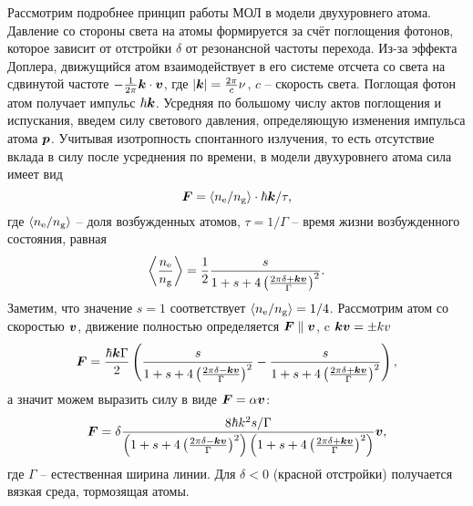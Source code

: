 % 


\startp
{}
Рассмотрим подробнее принцип работы МОЛ в модели двухуровнего атома. Давление со стороны света на атомы формируется за счёт поглощения фотонов, которое зависит от отстройки $\delta$ от резонансной частоты перехода. Из-за эффекта Доплера, движущийся атом взаимодействует в его системе отсчета со света на сдвинутой частоте $- \frac{1}{2\pi} \boldsymbol{k} \cdot \boldsymbol{v}$, где $|\boldsymbol{k}| = \frac{2\pi}{c}\nu$, $c$ -- скорость света. Поглощая фотон атом получает импульс $\hbar \boldsymbol{k}$. Усредняя по большому числу актов поглощения и испускания, введем силу светового давления, определяющую изменения импульса атома $\boldsymbol{p}$. Учитывая изотропность спонтанного излучения, то есть отсутствие вклада в силу после усреднения по времени, в модели двухуровнего атома сила имеет вид
\begin{equation}
	\boldsymbol{F} = \langle n_{\textnormal{e}} / n_{\textnormal{g}} \rangle \cdot \hbar \boldsymbol{k} / \tau,
\end{equation}
где $\langle n_{\textnormal{e}} / n_{\textnormal{g}} \rangle$ -- доля возбужденных атомов, $\tau = 1/\Gamma$ -- время жизни возбужденного состояния, равная
\begin{equation}
	\left\langle 
		\frac{n_{\textnormal{e}}}{n_{\textnormal{g}}}
	\right\rangle = \frac{1}{2} \frac{s}{1+s+4\left(\frac{2 \pi \delta + \boldsymbol{k} \boldsymbol{v}}{\Gamma}\right)^2}.
\end{equation}
Заметим, что значение $s=1$ соответствует $\langle n_{\textnormal{e}} / n_{\textnormal{g}} \rangle=1/4$. Рассмотрим атом со скоростью $\boldsymbol{v}$, движение полностью определяется $\boldsymbol{F} \parallel \boldsymbol{v}$, c $\boldsymbol{k} \boldsymbol{v} = \pm k v$
\begin{equation}
	\boldsymbol{F} = \frac{\hbar \boldsymbol{k} \Gamma}{2}\left(
		\frac{s}{1+s+4\left(\frac{2\pi \delta - \boldsymbol{k} \boldsymbol{v}}{\Gamma}\right)^2}-
		\frac{s}{1+s+4\left(\frac{2\pi \delta + \boldsymbol{k} \boldsymbol{v}}{\Gamma}\right)^2}
	\right),
	\label{eq:FM1}
\end{equation}
а значит можем выразить силу в виде $\boldsymbol{F} = \alpha \boldsymbol{v}$:
\begin{equation}
	\boldsymbol{F} = \delta \frac{8 \hbar k^2  s / \Gamma}{
		\left(
			1+s+4\left(\frac{2\pi \delta - \boldsymbol{k} \boldsymbol{v}}{\Gamma}\right)^2
		\right)\left(
			1+s+4\left(\frac{2\pi\delta+\boldsymbol{k} \boldsymbol{v}}{\Gamma}\right)^2
		\right)
	}\boldsymbol{v},
	\label{eq:FM2}
\end{equation}
где $\Gamma$ -- естественная ширина линии. Для $\delta < 0$ (красной отстройки) получается вязкая среда, тормозящая атомы. 



